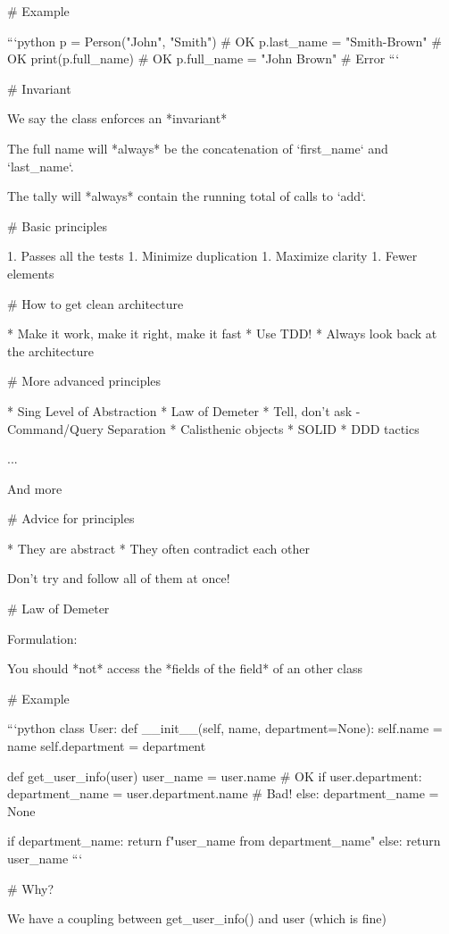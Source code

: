 # Example

```python
p = Person("John", "Smith")  # OK
p.last_name = "Smith-Brown"  # OK
print(p.full_name)           # OK
p.full_name = "John Brown"   # Error
```

# Invariant

We say the class enforces an *invariant*

The full name will *always* be the concatenation of `first_name`
and `last_name`.

The tally will *always* contain the running total of calls to `add`.

# Basic principles

1. Passes all the tests
1. Minimize duplication
1. Maximize clarity
1. Fewer elements

# How to get clean architecture

* Make it work, make it right, make it fast
* Use TDD!
* Always look back at the architecture

# More advanced principles

* Sing Level of Abstraction
* Law of Demeter
* Tell, don't ask - Command/Query Separation
* Calisthenic objects
* SOLID
* DDD tactics

...

And more

# Advice for principles

* They are abstract
* They often contradict each other

\vfill

Don't try and follow all of them at once!


# Law of Demeter

Formulation:

You should *not* access the *fields of the field* of an other class

# Example

```python
class User:
    def __init__(self, name, department=None):
        self.name = name
        self.department = department

def get_user_info(user)
    user_name = user.name  # OK
    if user.department:
        department_name = user.department.name  # Bad!
    else:
        department_name = None

    if department_name:
        return f"{user_name} from {department_name}"
    else:
        return user_name
```

# Why?

We have a coupling between get_user_info() and user (which is fine)

